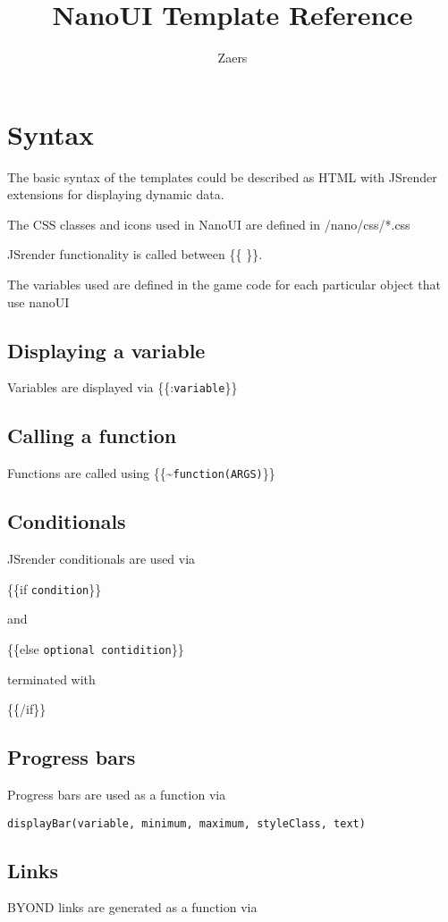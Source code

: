 \documentclass[10pt, a4paper]{article}
\title{NanoUI Template Reference}
\author{Zaers}
\begin{document}
\begin{titlepage}
 \maketitle
 \tableofcontents
\end{titlepage}
\section{Syntax}

The basic syntax of the templates could be described as HTML with JSrender extensions for displaying dynamic data.

The CSS classes and icons used in NanoUI are defined in /nano/css/*.css

JSrender functionality is called between \{\{ \}\}.

The variables used are defined in the game code for each particular object that use nanoUI

\subsection{Displaying a variable}
Variables are displayed via \{\{:\verb|variable|\}\}

\subsection{Calling a function}
Functions are called using \{\{\textasciitilde\verb|function(ARGS)|\}\}

\subsection{Conditionals}
JSrender conditionals are used via 

\{\{if \verb|condition|\}\}

and 

\{\{else \verb|optional contidition|\}\}

terminated with

\{\{/if\}\}

\subsection{Progress bars}
Progress bars are used as a function via 

\verb|displayBar(variable, minimum, maximum, styleClass, text)|

\subsection{Links}
BYOND links are generated as a function via
\end{document}

